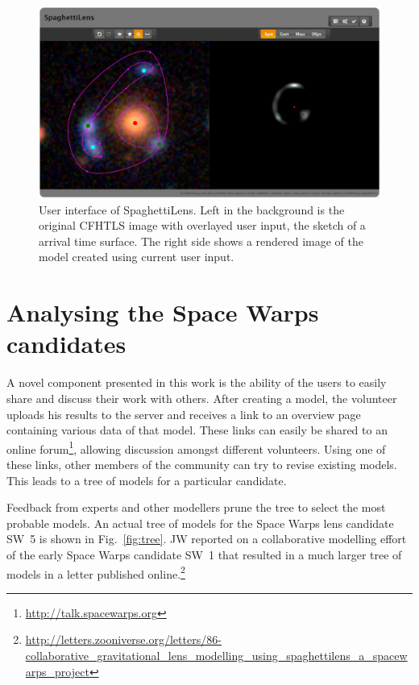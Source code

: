 \documentclass{ws-procs975x65}
\newcommand{\spl}{SpaghettiLens\xspace}
\newcommand{\sw}{Space Warps\xspace}
\newcommand{\figref}[1]{Fig.~\ref{fig:#1}}
\newcommand{\SW}[1]{SW~#1\xspace}
\begin{document}
\begin{figure}
  \centering
  \includegraphics[width=\columnwidth]{screenshot_new}
  \caption{
    User interface of \spl. Left in the background is the original CFHTLS image with overlayed user input, the sketch of a arrival time surface. The right side shows a rendered image of the model created using current user input.
  }
  \label{fig:ui}
\end{figure}


\section{Analysing the \sw candidates}

A novel component presented in this work is the ability of the users to easily share and discuss their work with others.
After creating a model, the volunteer uploads his results to the server and receives a link to an overview page containing various data of that model.
These links can easily be shared to an online forum\footnote{\url{http://talk.spacewarps.org}}, allowing discussion amongst different volunteers.
Using one of these links, other members of the community can try to revise existing models.
This leads to a tree of models for a particular candidate.

Feedback from experts and other modellers prune the tree to select the most probable models.
An actual tree of models for the \sw lens candidate \SW{5} is shown in \figref{tree}.
JW reported on a collaborative modelling effort of the early \sw candidate \SW{1} that resulted in a much larger tree of models in a letter published online.\footnote{\url{http://letters.zooniverse.org/letters/86-collaborative_gravitational_lens_modelling_using_spaghettilens_a_spacewarps_project}}


\end{document}
